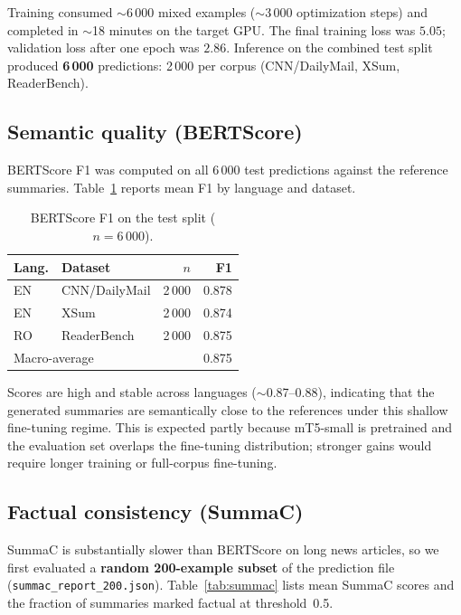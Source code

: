 \documentclass[11pt,a4paper]{article}
\begin{document}
Training consumed ${\sim}$6\,000 mixed examples (${\sim}$3\,000 optimization steps) and completed in ${\sim}$18 minutes on the target GPU.
The final training loss was $5.05$; validation loss after one epoch was $2.86$.
Inference on the combined test split produced \textbf{6\,000} predictions: 2\,000 per corpus (CNN/DailyMail, XSum, ReaderBench).

\subsection{Semantic quality (BERTScore)}

BERTScore F1 was computed on all 6\,000 test predictions against the reference summaries.
Table~\ref{tab:bertscore} reports mean F1 by language and dataset.

\begin{table}[h]
  \centering
  \small
  \caption{BERTScore F1 on the test split ($n=6\,000$).}
  \label{tab:bertscore}
  \begin{tabular}{@{}llrr@{}}
    \toprule
    Lang. & Dataset & $n$ & F1 \\
    \midrule
    EN & CNN/DailyMail & 2\,000 & 0.878 \\
    EN & XSum & 2\,000 & 0.874 \\
    RO & ReaderBench & 2\,000 & 0.875 \\
    \midrule
    \multicolumn{2}{l}{Macro-average} & & 0.875 \\
    \bottomrule
  \end{tabular}
\end{table}

Scores are high and stable across languages (${\sim}$0.87--0.88), indicating that the generated summaries are semantically close to the references under this shallow fine-tuning regime.
This is expected partly because mT5-small is pretrained and the evaluation set overlaps the fine-tuning distribution; stronger gains would require longer training or full-corpus fine-tuning.

\subsection{Factual consistency (SummaC)}

SummaC is substantially slower than BERTScore on long news articles, so we first evaluated a \textbf{random 200-example subset} of the prediction file (\texttt{summac\_report\_200.json}).
Table~\ref{tab:summac} lists mean SummaC scores and the fraction of summaries marked factual at threshold~0.5.
\end{document}
